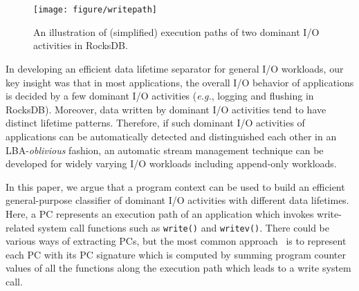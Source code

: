 \vspace{-10pt}
\section{}
\label{sec:programcontext}
\vspace{-5pt}
\begin{figure}[t]
	\centering
	\texttt{[image: figure/writepath]}
	\vspace{-10pt}
	\caption{An illustration of (simplified) execution paths of two dominant I/O activities in RocksDB.}
	\label{fig:iopath}
	\vspace{-20pt}
\end{figure}

In developing an efficient data lifetime separator for general I/O workloads,
our key insight was that in most applications, the overall I/O behavior of
applications is decided by a few dominant I/O activities ({\it e.g.}, logging and
flushing in RocksDB).  Moreover, data written by dominant I/O activities tend
to have distinct lifetime patterns.  Therefore, if such dominant I/O activities
of applications can be automatically detected and distinguished each other in
an LBA-{\it oblivious} fashion, an automatic stream management technique can be
developed for widely varying I/O workloads including append-only workloads.

In this paper, we argue that a program context can be used to build an
efficient general-purpose classifier of dominant I/O activities with different
data lifetimes.  Here, a PC represents an execution path of an application
which invokes write-related system call functions such as {\tt write()} and
{\tt writev()}.  There could be various ways of extracting PCs, but the most
common approach~\cite{PC, PC2} is to represent each PC with its PC signature
which is computed by summing program counter values of all the functions along
the execution path which leads to a write system call.


